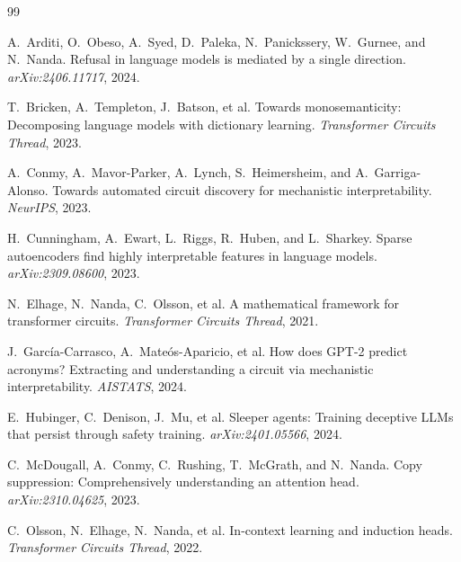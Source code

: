 \documentclass[11pt]{article}
\theoremstyle{definition}
\theoremstyle{plain}
\theoremstyle{remark}
\begin{document}
\begin{thebibliography}{99}

A.~Arditi, O.~Obeso, A.~Syed, D.~Paleka, N.~Panickssery, W.~Gurnee, and N.~Nanda.
\newblock Refusal in language models is mediated by a single direction.
\newblock \emph{arXiv:2406.11717}, 2024.

T.~Bricken, A.~Templeton, J.~Batson, et al.
\newblock Towards monosemanticity: Decomposing language models with dictionary learning.
\newblock \emph{Transformer Circuits Thread}, 2023.

A.~Conmy, A.~Mavor-Parker, A.~Lynch, S.~Heimersheim, and A.~Garriga-Alonso.
\newblock Towards automated circuit discovery for mechanistic interpretability.
\newblock \emph{NeurIPS}, 2023.

H.~Cunningham, A.~Ewart, L.~Riggs, R.~Huben, and L.~Sharkey.
\newblock Sparse autoencoders find highly interpretable features in language models.
\newblock \emph{arXiv:2309.08600}, 2023.

N.~Elhage, N.~Nanda, C.~Olsson, et al.
\newblock A mathematical framework for transformer circuits.
\newblock \emph{Transformer Circuits Thread}, 2021.

J.~Garc\'ia-Carrasco, A.~Mate\'os-Aparicio, et al.
\newblock How does GPT-2 predict acronyms? Extracting and understanding a circuit via mechanistic interpretability.
\newblock \emph{AISTATS}, 2024.

E.~Hubinger, C.~Denison, J.~Mu, et al.
\newblock Sleeper agents: Training deceptive LLMs that persist through safety training.
\newblock \emph{arXiv:2401.05566}, 2024.

C.~McDougall, A.~Conmy, C.~Rushing, T.~McGrath, and N.~Nanda.
\newblock Copy suppression: Comprehensively understanding an attention head.
\newblock \emph{arXiv:2310.04625}, 2023.

C.~Olsson, N.~Elhage, N.~Nanda, et al.
\newblock In-context learning and induction heads.
\newblock \emph{Transformer Circuits Thread}, 2022.


\end{thebibliography}
\end{document}
